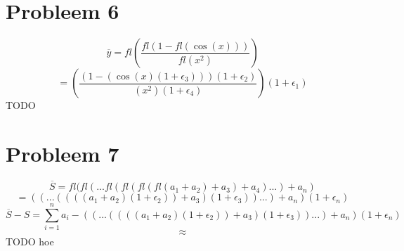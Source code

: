 \documentclass[12pt,a4paper]{article}
\begin{document}
\section{Probleem 6}
\[
\overline{y}
=
fl
\left(
\frac{
fl\left(
1-fl(\cos(x))
\right)}
{fl(x^2)}
\right)
\]
\[
=
\left(
\frac{
\left(
1-(\cos(x)(1+\epsilon_3))
\right)(1+\epsilon_2)}
{(x^2)(1+\epsilon_4)}
\right)(1+\epsilon_1)
\]
TODO

\section{Probleem 7}
\[
\overline{S} = fl(fl(...fl(fl(fl(fl(a_1+a_2)+a_3)+a_4)...)+a_n)
\]
\[
= ((...((((a_1+a_2)(1+\epsilon_2))+a_3)(1+\epsilon_3))...)+a_n)(1+\epsilon_n)
\]
\[
\overline{S}-S = \sum_{i=1}^na_i - ((...((((a_1+a_2)(1+\epsilon_2))+a_3)(1+\epsilon_3))...)+a_n)(1+\epsilon_n)
\]
\[
\approx 
\]
TODO hoe
\end{document}
